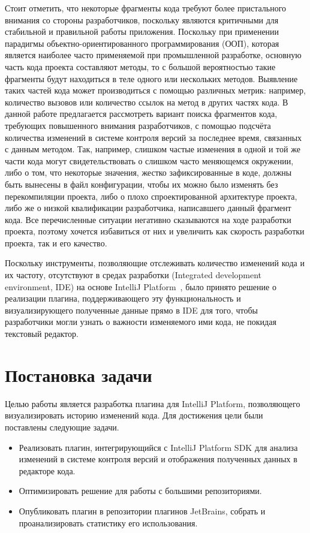\documentclass[14pt]{matmex-diploma-custom}
\begin{document}
    
    Стоит отметить, что некоторые фрагменты кода требуют более пристального внимания со стороны разработчиков, поскольку являются критичными для стабильной и правильной работы приложения. Поскольку при применении парадигмы объектно-ориентированного программирования (ООП), которая является наиболее часто применяемой при промышленной разработке, основную часть кода проекта составляют методы, то с большой вероятностью такие фрагменты будут находиться в теле одного или нескольких методов. Выявление таких частей кода может производиться с помощью различных метрик: например, количество вызовов или количество ссылок на метод в других частях кода. В данной работе предлагается рассмотреть вариант поиска фрагментов кода, требующих повышенного внимания разработчиков, с помощью подсчёта количества изменений в системе контроля версий за последнее время, связанных с данным методом. Так, например, слишком частые изменения в одной и той же части кода могут свидетельствовать о слишком часто меняющемся окружении, либо о том, что некоторые значения, жестко зафиксированные в коде, должны быть вынесены в файл конфигурации, чтобы их можно было изменять без перекомпиляции проекта, либо о плохо спроектированной архитектуре проекта, либо же о низкой квалификации разработчика, написавшего данный фрагмент кода. Все перечисленные ситуации негативно сказываются на ходе разработки проекта, поэтому хочется избавиться от них и увеличить как скорость разработки проекта, так и его качество.
    
    
   Поскольку инструменты, позволяющие отслеживать количество изменений кода и их частоту, отсутствуют в средах разработки (Integrated development environment, IDE) на основе IntelliJ Platform~\cite{platform}, было принято решение о реализации плагина, поддерживающего эту функциональность и визуализирующего полученные данные прямо в IDE для того, чтобы разработчики могли узнать о важности изменяемого ими кода, не покидая текстовый редактор. 
    
\section{Постановка задачи}
Целью работы является разработка плагина для IntelliJ Platform, позволяющего визуализировать историю изменений кода. Для достижения цели были поставлены следующие задачи.
\begin{itemize}
    \item Реализовать плагин, интегрирующийся с IntelliJ Platform SDK для анализа изменений в системе контроля версий и отображения полученных данных в редакторе кода.
    \item Оптимизировать решение для работы с большими репозиториями.
    \item Опубликовать плагин в репозитории плагинов JetBrains, собрать и проанализировать статистику его использования.
\end{itemize}
\end{document}
